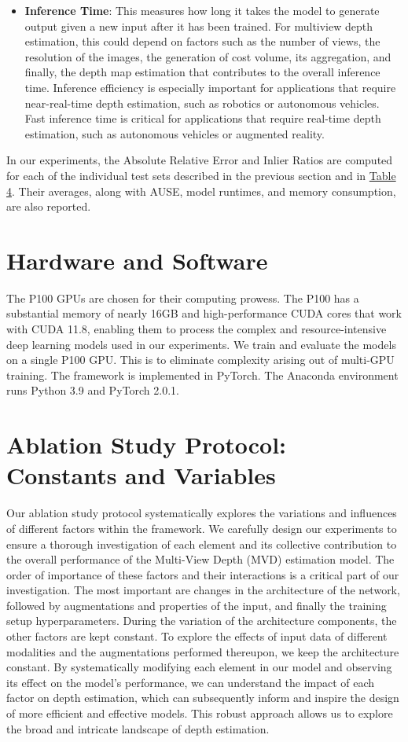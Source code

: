 \begin{itemize}
    \item \textbf{Inference Time}: This measures how long it takes the model to generate output given a new input after it has been trained. For multiview depth estimation, this could depend on factors such as the number of views, the resolution of the images, the generation of cost volume, its aggregation, and finally, the depth map estimation that contributes to the overall inference time. Inference efficiency is especially important for applications that require near-real-time depth estimation, such as robotics or autonomous vehicles. Fast inference time is critical for applications that require real-time depth estimation, such as autonomous vehicles or augmented reality. 
\end{itemize}
In our experiments, the Absolute Relative Error and Inlier Ratios are computed for each of the individual test sets described in the previous section and in \hyperref[tab:test-sets]{Table 4}. Their averages, along with AUSE, model runtimes, and memory consumption, are also reported.  
\section{Hardware and Software}
The P100 GPUs are chosen for their computing prowess. The P100 has a substantial memory of nearly 16GB and high-performance CUDA cores that work with CUDA 11.8, enabling them to process the complex and resource-intensive deep learning models used in our experiments. We train and evaluate the models on a single P100 GPU. This is to eliminate complexity arising out of multi-GPU training. The {\framework} framework is implemented in PyTorch. The Anaconda environment runs Python 3.9 and PyTorch 2.0.1. 

\section{Ablation Study Protocol: Constants and Variables}\label{sec:ablation-protocol}
Our ablation study protocol systematically explores the variations and influences of different factors within the {\rmvd} framework. We carefully design our experiments to ensure a thorough investigation of each element and its collective contribution to the overall performance of the Multi-View Depth (MVD) estimation model.
The order of importance of these factors and their interactions is a critical part of our investigation. The most important are changes in the architecture of the network, followed by augmentations and properties of the input, and finally the training setup hyperparameters. During the variation of the architecture components, the other factors are kept constant. To explore the effects of input data of different modalities and the augmentations performed thereupon, we keep the architecture constant. By systematically modifying each element in our model and observing its effect on the model's performance, we can understand the impact of each factor on depth estimation, which can subsequently inform and inspire the design of more efficient and effective models. This robust approach allows us to explore the broad and intricate landscape of depth estimation. 
